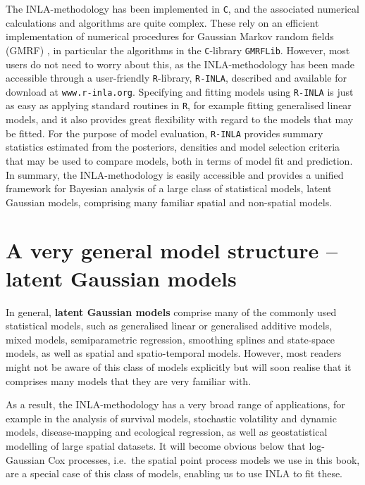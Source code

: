 The INLA-methodology has been implemented in \texttt{C}, and the associated numerical calculations and algorithms are quite complex. These rely on an efficient implementation of numerical  procedures for Gaussian Markov random fields (GMRF) \citep{rueheld:05}, in particular the algorithms in the \texttt{C}-library \texttt{GMRFLib}.  However, most users do not need to worry about this, as the INLA-methodology has been made accessible through a user-friendly \texttt{R}-library, \texttt{R-INLA}, described and available for download at \texttt{www.r-inla.org}.  Specifying and fitting models using  \texttt{R-INLA} is just as easy as applying standard routines in \texttt{R},  for example fitting generalised linear models, and it also provides great flexibility with regard to the models that may be fitted. For the purpose of model evaluation, \texttt{R-INLA} provides summary statistics estimated from the posteriors, densities and model selection criteria that may be used to compare models, both in terms of model fit and prediction.  In summary, the INLA-methodology is easily accessible and provides a unified framework for Bayesian analysis of  a large class of statistical models, latent Gaussian models, comprising many familiar spatial and non-spatial models.


\section{A very general model structure -- latent Gaussian models}\label{LGM}

In general, \textbf{latent Gaussian models} comprise many of the commonly used statistical models,  such as generalised linear or generalised additive models, mixed models, semiparametric regression, smoothing splines and state-space models, as well as spatial and spatio-temporal models. However, most readers might not be aware of this class of models explicitly but will soon realise that it comprises many models that they are very familiar with.

As a result,  the INLA-methodology has a very broad range of applications, for example in the analysis of survival models,  stochastic volatility and dynamic models, disease-mapping and ecological regression, as well as geostatistical modelling of large spatial datasets. 
It will become obvious below that log-Gaussian Cox processes, i.e.\ the spatial point process models we use in this book,  are a special case of this class of models, enabling us to use INLA to fit these. 


